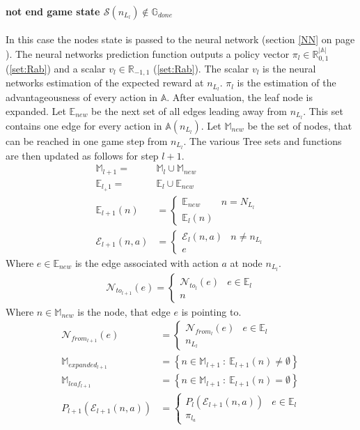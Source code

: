 \documentclass[12pt]{article}
\newcommand{\sectionref}[1]{section \ref{#1} on page \pageref{#1}}
\newcommand{\quckeq}[1]{(\ref{#1})}
\begin{document}
\paragraph{not end game state \(\mathcal S(n_{L_l}) \not\in \mathbb G_{done}\)}
In this case the nodes state is passed to the neural network (\sectionref{NN}). The neural networks prediction function outputs a policy vector \(\pi_l \in \mathbb R_{0,1}^{|\mathbb A|}\) \quckeq{set:Rab} and a scalar \(v_l \in \mathbb R_{-1,1}\) \quckeq{set:Rab}. The scalar \(v_l\) is the neural networks estimation of the expected reward at \(n_{L_l}\). \(\pi_l\) is the estimation of the advantageousness of every action in \(\mathbb A\). After evaluation, the leaf node is expanded.
Let \(\mathbb E_{new}\) be the next set of all edges leading away from \(n_{L_l}\). This set contains one edge for every action in \(\mathbb A(n_{L_l})\).
Let \(\mathbb M_{new}\) be the set of nodes, that can be reached in one game step from \(n_{L_l}\).
The various Tree sets and functions are then updated as follows for step \(l+1\).
\begin{align}
\mathbb M_{l+1}   =& \mathbb M_l \cup \mathbb M_{new} \\
\mathbb E_{l_+1}  =& \mathbb E_l  \cup \mathbb E_{new} \\
%
\mathbb E_{l+1}(n) &= 
\left\{
\begin{matrix}
\mathbb E_{new} & n = N_{L_l}\\
\mathbb E_l(n)
\end{matrix}
\right.\\
%
\mathcal E_{l+1}(n, a) &=
\left\{
\begin{matrix}
\mathcal E_l (n, a) & n\neq n_{L_l}\\
e &
\end{matrix}
\right.
\end{align}
Where \(e \in\mathbb E_{new}\) is the edge associated with action \(a\) at node \(n_{L_l}\).
\begin{align}
\mathcal N_{to_{l+1}}(e) = 
\left\{
\begin{matrix}
\mathcal N_{to_l} (e) & e \in \mathbb E_l\\
n &
\end{matrix}
\right.
\end{align}
Where \(n\in\mathbb M_{new}\) is the node, that edge \(e\) is pointing to.
\begin{align}
\mathcal N_{from_{l+1}}(e) &= 
\left\{
\begin{matrix}
\mathcal N_{from_l} (e) & e \in\mathbb E_l\\
n _{L_l}&
\end{matrix}
\right.\\
\mathbb M_{expanded_{l+1}} &= \left\{n\in\mathbb M_{l+1}~:~\mathbb E_{l+1}(n) \neq \emptyset\right\}\\
\mathbb M_{leaf_{l+1}} &= \left\{n\in\mathbb M_{l+1}~:~\mathbb E_{l+1}(n) = \emptyset\right\}\\
P_{l+1}(\mathcal E_{l+1}(n, a)) &= 
\left\{
\begin{matrix}
P_l (\mathcal E_{l+1}(n, a)) & e \in\mathbb E_l\\
\pi_{l_a}&
\end{matrix}
\right.
\end{align}
\end{document}
